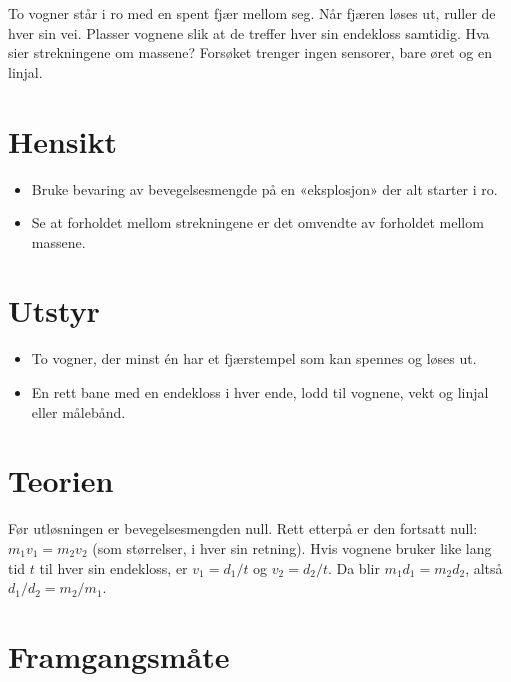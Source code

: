 \documentclass[11pt]{article}
\begin{document}

To vogner står i ro med en spent fjær mellom seg. Når fjæren løses ut, ruller de hver sin vei. Plasser vognene slik at de treffer hver sin endekloss samtidig. Hva sier strekningene om massene? Forsøket trenger ingen sensorer, bare øret og en linjal.

\section*{Hensikt}

\begin{itemize}
\item Bruke bevaring av bevegelsesmengde på en «eksplosjon» der alt starter i ro.
\item Se at forholdet mellom strekningene er det omvendte av forholdet mellom massene.
\end{itemize}

\section*{Utstyr}

\begin{itemize}
\item To vogner, der minst én har et fjærstempel som kan spennes og løses ut.
\item En rett bane med en endekloss i hver ende, lodd til vognene, vekt og linjal eller målebånd.
\end{itemize}

\section*{Teorien}

Før utløsningen er bevegelsesmengden null. Rett etterpå er den fortsatt null: $m_{1}v_{1} = m_{2}v_{2}$ (som størrelser, i hver sin retning). Hvis vognene bruker like lang tid $t$ til hver sin endekloss, er $v_{1} = d_{1}/t$ og $v_{2} = d_{2}/t$. Da blir $m_{1}d_{1} = m_{2}d_{2}$, altså $d_{1}/d_{2} = m_{2}/m_{1}$.

\section*{Framgangsmåte}
\end{document}
